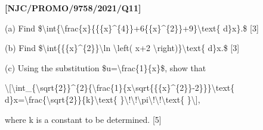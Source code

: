 \item \textbf{{[}NJC/PROMO/9758/2021/Q11{]}} 

(a) Find \$\textbackslash int\{\textbackslash frac\{x\}\{\{\{x\}\textasciicircum\{4\}\}+6\{\{x\}\textasciicircum\{2\}\}+9\}\textbackslash text\{
d\}x\}.\$ {[}3{]}

(b) Find \$\textbackslash int\{\{\{x\}\textasciicircum\{2\}\}\textbackslash ln
\textbackslash left( x+2 \textbackslash right)\}\textbackslash text\{
d\}x.\$ {[}3{]} 

(c) Using the substitution \$u=\textbackslash frac\{1\}\{x\}\$, show
that 

\textbackslash{[}\textbackslash int\_\{\textbackslash sqrt\{2\}\}\textasciicircum\{2\}\{\textbackslash frac\{1\}\{x\textbackslash sqrt\{\{\{x\}\textasciicircum\{2\}\}-2\}\}\}\textbackslash text\{
d\}x=\textbackslash frac\{\textbackslash sqrt\{2\}\}\{k\}\textbackslash text\{
\}\textbackslash !\textbackslash !\textbackslash pi\textbackslash !\textbackslash !\textbackslash text\{
\}\textbackslash{]},

where k is a constant to be determined. {[}5{]}